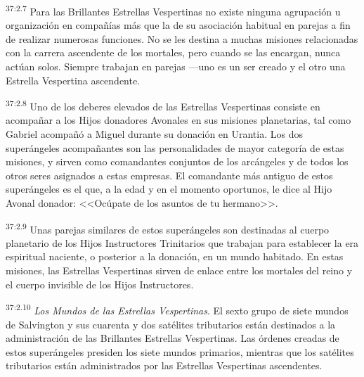 \par
\textsuperscript{37:2.7} Para las Brillantes Estrellas Vespertinas no existe ninguna agrupación u organización en compañías más que la de su asociación habitual en parejas a fin de realizar numerosas funciones. No se les destina a muchas misiones relacionadas con la carrera ascendente de los mortales, pero cuando se las encargan, nunca actúan solos. Siempre trabajan en parejas ---uno es un ser creado y el otro una Estrella Vespertina ascendente.

\par
\textsuperscript{37:2.8} Uno de los deberes elevados de las Estrellas Vespertinas consiste en acompañar a los Hijos donadores Avonales en sus misiones planetarias, tal como Gabriel acompañó a Miguel durante su donación en Urantia. Los dos superángeles acompañantes son las personalidades de mayor categoría de estas misiones, y sirven como comandantes conjuntos de los arcángeles y de todos los otros seres asignados a estas empresas. El comandante más antiguo de estos superángeles es el que, a la edad y en el momento oportunos, le dice al Hijo Avonal donador: <<Ocúpate de los asuntos de tu hermano>>.

\par
\textsuperscript{37:2.9} Unas parejas similares de estos superángeles son destinadas al cuerpo planetario de los Hijos Instructores Trinitarios que trabajan para establecer la era espiritual naciente, o posterior a la donación, en un mundo habitado. En estas misiones, las Estrellas Vespertinas sirven de enlace entre los mortales del reino y el cuerpo invisible de los Hijos Instructores.

\par
\textsuperscript{37:2.10} \textit{Los Mundos de las Estrellas Vespertinas}. El sexto grupo de siete mundos de Salvington y sus cuarenta y dos satélites tributarios están destinados a la administración de las Brillantes Estrellas Vespertinas. Las órdenes creadas de estos superángeles presiden los siete mundos primarios, mientras que los satélites tributarios están administrados por las Estrellas Vespertinas ascendentes.

